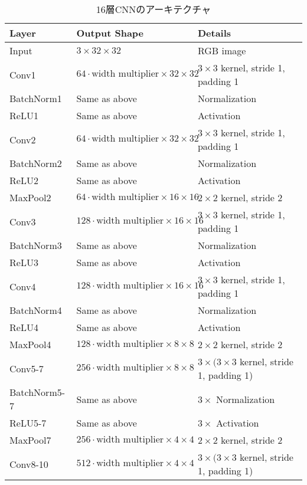 \begin{table}[h]
    \centering
    \caption{16層CNNのアーキテクチャ}
    \label{tab:cnn16layer}
    \begin{tabular}{lll}
    \toprule
    \textbf{Layer} & \textbf{Output Shape} & \textbf{Details} \\
    \midrule
    Input & $3 \times 32 \times 32$ & RGB image \\
    Conv1 & $64 \cdot \text{width multiplier} \times 32 \times 32$ & $3 \times 3$ kernel, stride 1, padding 1 \\
    BatchNorm1 & Same as above & Normalization \\
    ReLU1 & Same as above & Activation \\
    Conv2 & $64 \cdot \text{width multiplier} \times 32 \times 32$ & $3 \times 3$ kernel, stride 1, padding 1 \\
    BatchNorm2 & Same as above & Normalization \\
    ReLU2 & Same as above & Activation \\
    MaxPool2 & $64 \cdot \text{width multiplier} \times 16 \times 16$ & $2 \times 2$ kernel, stride 2 \\
    Conv3 & $128 \cdot \text{width multiplier} \times 16 \times 16$ & $3 \times 3$ kernel, stride 1, padding 1 \\
    BatchNorm3 & Same as above & Normalization \\
    ReLU3 & Same as above & Activation \\
    Conv4 & $128 \cdot \text{width multiplier} \times 16 \times 16$ & $3 \times 3$ kernel, stride 1, padding 1 \\
    BatchNorm4 & Same as above & Normalization \\
    ReLU4 & Same as above & Activation \\
    MaxPool4 & $128 \cdot \text{width multiplier} \times 8 \times 8$ & $2 \times 2$ kernel, stride 2 \\
    Conv5-7 & $256 \cdot \text{width multiplier} \times 8 \times 8$ & $3 \times (3 \times 3$ kernel, stride 1, padding 1) \\
    BatchNorm5-7 & Same as above & $3 \times$ Normalization \\
    ReLU5-7 & Same as above & $3 \times$ Activation \\
    MaxPool7 & $256 \cdot \text{width multiplier} \times 4 \times 4$ & $2 \times 2$ kernel, stride 2 \\
    Conv8-10 & $512 \cdot \text{width multiplier} \times 4 \times 4$ & $3 \times (3 \times 3$ kernel, stride 1, padding 1) \\

\end{tabular}
\end{table}
